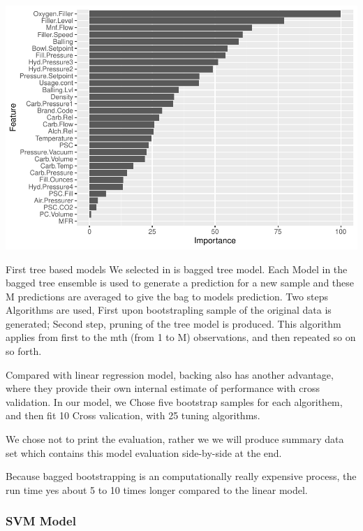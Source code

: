 \documentclass[]{article}
\begin{document}
\begin{center}\includegraphics{OmerOzeren_GracieHan_Project_2_files/figure-latex/unnamed-chunk-18-2} \end{center}

First tree based models We selected in is bagged tree model. Each Model
in the bagged tree ensemble is used to generate a prediction for a new
sample and these M predictions are averaged to give the bag to models
prediction. Two steps Algorithms are used, First upon bootstrapling
sample of the original data is generated; Second step, pruning of the
tree model is produced. This algorithm applies from first to the mth
(from 1 to M) observations, and then repeated so on so forth.

Compared with linear regression model, backing also has another
advantage, where they provide their own internal estimate of performance
with cross validation. In our model, we Chose five bootstrap samples for
each algorithem, and then fit 10 Cross valication, with 25 tuning
algorithms.

We chose not to print the evaluation, rather we we will produce summary
data set which contains this model evaluation side-by-side at the end.

Because bagged bootstrapping is an computationally really expensive
process, the run time yes about 5 to 10 times longer compared to the
linear model.

\subsubsection{SVM Model}\label{svm-model}
\end{document}
